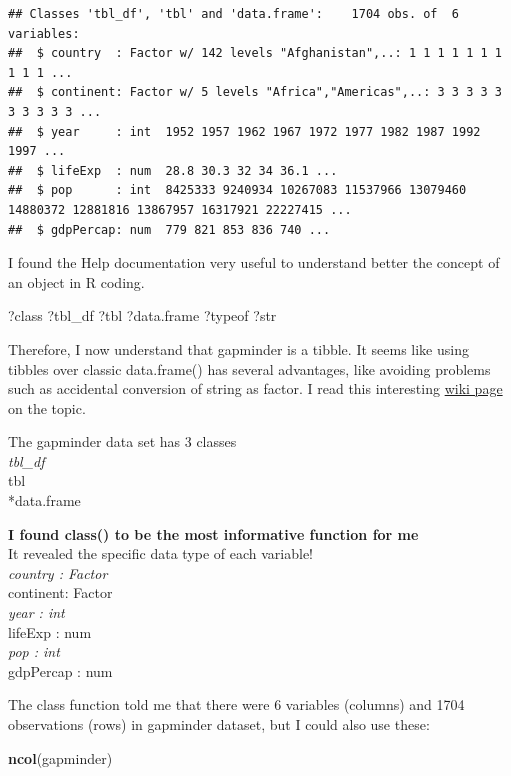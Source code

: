 \documentclass[]{article}
\newenvironment{Shaded}{\begin{snugshade}}{\end{snugshade}}
\newcommand{\KeywordTok}[1]{\textcolor[rgb]{0.13,0.29,0.53}{\textbf{{#1}}}}
\newcommand{\NormalTok}[1]{{#1}}
\begin{document}
\begin{verbatim}
## Classes 'tbl_df', 'tbl' and 'data.frame':    1704 obs. of  6 variables:
##  $ country  : Factor w/ 142 levels "Afghanistan",..: 1 1 1 1 1 1 1 1 1 1 ...
##  $ continent: Factor w/ 5 levels "Africa","Americas",..: 3 3 3 3 3 3 3 3 3 3 ...
##  $ year     : int  1952 1957 1962 1967 1972 1977 1982 1987 1992 1997 ...
##  $ lifeExp  : num  28.8 30.3 32 34 36.1 ...
##  $ pop      : int  8425333 9240934 10267083 11537966 13079460 14880372 12881816 13867957 16317921 22227415 ...
##  $ gdpPercap: num  779 821 853 836 740 ...
\end{verbatim}

I found the Help documentation very useful to understand better the
concept of an object in R coding.

\begin{Shaded}
\begin{Highlighting}[]
\NormalTok{?class}
\NormalTok{?tbl_df}
\NormalTok{?tbl}
\NormalTok{?data.frame}
\NormalTok{?typeof}
\NormalTok{?str}
\end{Highlighting}
\end{Shaded}

Therefore, I now understand that gapminder is a tibble. It seems like
using tibbles over classic data.frame() has several advantages, like
avoiding problems such as accidental conversion of string as factor. I
read this interesting
\href{http://www.sthda.com/english/wiki/tibble-data-format-in-r-best-and-modern-way-to-work-with-your-data}{wiki
page} on the topic.

The gapminder data set has 3 classes\\
\emph{tbl\_df\\
}tbl\\
*data.frame

\textbf{I found class() to be the most informative function for me}\\
It revealed the specific data type of each variable!\\
\emph{country : Factor\\
}continent: Factor\\
\emph{year : int\\
}lifeExp : num\\
\emph{pop : int\\
}gdpPercap : num

The class function told me that there were 6 variables (columns) and
1704 observations (rows) in gapminder dataset, but I could also use
these:

\begin{Shaded}
\begin{Highlighting}[]
\KeywordTok{ncol}\NormalTok{(gapminder)}
\end{Highlighting}
\end{Shaded}
\end{document}
